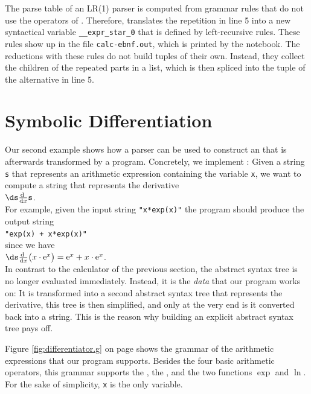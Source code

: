 \remarkEng
The parse table of an LR(1) parser is computed from grammar rules that do not use the operators of
.  Therefore,  translates the repetition in line 5 into a new syntactical
variable \texttt{\_\_expr\_star\_0} that is defined by left-recursive rules.  These rules show up in the file
\texttt{calc-ebnf.out}, which is printed by the notebook.  The reductions with these rules do not build tuples
of their own.  Instead, they collect the children of the repeated parts in a list, which is then spliced into
the tuple of the alternative in line 5.  \eox

\section{Symbolic Differentiation  \label{section:differentiator}}
Our second example shows how a parser can be used to construct an  that is
afterwards transformed by a program.  Concretely, we implement :  Given a
string \texttt{s} that represents an arithmetic expression containing the variable \texttt{x}, we want to
compute a string that represents the derivative
\\[0.2cm]
\hspace*{1.3cm}
$\ds\frac{\mathrm{d}\;}{\mathrm{d}x} \texttt{s}$.
\\[0.2cm]
For example, given the input string \texttt{"x*exp(x)"} the program should produce the output string
\\[0.2cm]
\hspace*{1.3cm}
\texttt{"exp(x) + x*exp(x)"}
\\[0.2cm]
since we have
\\[0.2cm]
\hspace*{1.3cm}
$\ds\frac{\mathrm{d}\;}{\mathrm{d}x} \bigl( x \cdot \mathrm{e}^x \bigr) = \mathrm{e}^x + x \cdot \mathrm{e}^x$.
\\[0.2cm]
In contrast to the calculator of the previous section, the abstract syntax tree is no longer evaluated
immediately.  Instead, it is the \emph{data} that our program works on:  It is transformed into a second
abstract syntax tree that represents the derivative, this tree is then simplified, and only at the very
end is it converted back into a string.  This is the reason why building an explicit abstract syntax tree
pays off.

Figure \ref{fig:differentiator.g} on page \pageref{fig:differentiator.g} shows the grammar of the
arithmetic expressions that our program supports.  Besides the four basic arithmetic operators, this
grammar supports the  \squoted{**}, the , and the two
functions $\exp$ and $\ln$.  For the sake of simplicity, \texttt{x} is the only variable.

